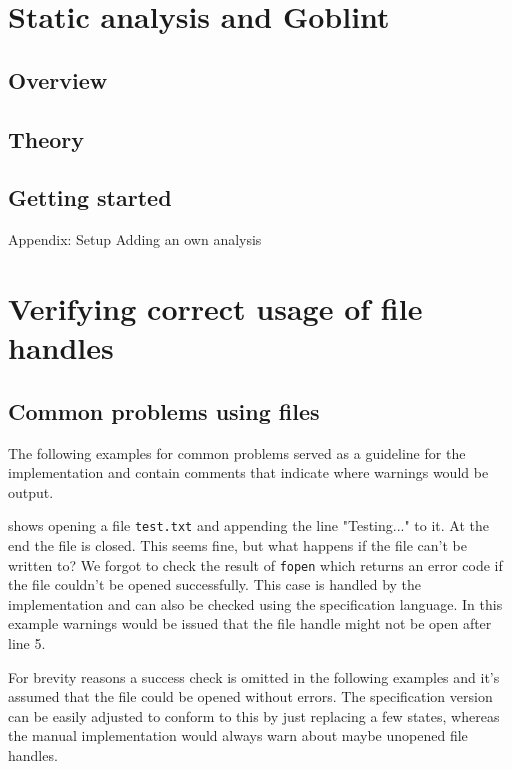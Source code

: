 


\chapter{Static analysis and Goblint}
\section{Overview}

\section{Theory}

\section{Getting started}
Appendix: Setup
Adding an own analysis


\chapter{Verifying correct usage of file handles}
\section{Common problems using files}
The following examples for common problems served as a guideline for the implementation and contain comments that indicate where warnings would be output.

 shows opening a file \verb|test.txt| and appending the line "Testing..." to it. At the end the file is closed.
This seems fine, but what happens if the file can't be written to?
We forgot to check the result of \verb|fopen| which returns an error code if the file couldn't be opened successfully.
This case is handled by the implementation and can also be checked using the specification language. In this example warnings would be issued that the file handle might not be open after line 5.

For brevity reasons a success check is omitted in the following examples and it's assumed that the file could be opened without errors. The specification version can be easily adjusted to conform to this by just replacing a few states, whereas the manual implementation would always warn about maybe unopened file handles.



